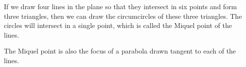 If we draw four lines in the plane so that they intersect in six points 
and form three triangles, then we can draw the circumcircles of these three
triangles. The circles will intersect in a single point, which is called
the Miquel point of the lines.
\par
The Miquel point is also the focus of a parabola drawn tangent to each of 
the lines.